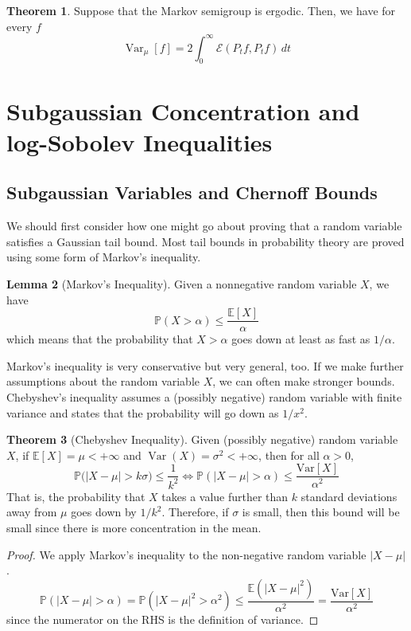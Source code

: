\documentclass{article}
\DeclareMathOperator{\Var}{Var}
\theoremstyle{definition}
\newtheorem{theorem}{Theorem}[section]
\newtheorem{lemma}[theorem]{Lemma}
\theoremstyle{remark}
\theoremstyle{definition}
\begin{document}
  \begin{theorem}
  Suppose that the Markov semigroup is ergodic. Then, we have for every $f$ 
  \[\Var_\mu [f] = 2 \int_0^\infty \mathcal{E}(P_t f, P_t f) \, dt\]
  \end{theorem}

\section{Subgaussian Concentration and log-Sobolev Inequalities}

  \subsection{Subgaussian Variables and Chernoff Bounds}

  We should first consider how one might go about proving that a random variable satisfies a Gaussian tail bound. Most tail bounds in probability theory are proved using some form of Markov's inequality. 
  \begin{lemma}[Markov's Inequality]
  Given a nonnegative random variable $X$, we have 
  \[\mathbb{P}(X > \alpha) \leq \frac{\mathbb{E}[X]}{\alpha}\]
  which means that the probability that $X > \alpha$ goes down at least as fast as $1/\alpha$. 
  \end{lemma}

  Markov's inequality is very conservative but very general, too. If we make further assumptions about the random variable $X$, we can often make stronger bounds. Chebyshev's inequality assumes a (possibly negative) random variable with finite variance and states that the probability will go down as $1/x^2$. 

  \begin{theorem}[Chebyshev Inequality]
  Given (possibly negative) random variable $X$, if $\mathbb{E}[X] = \mu < +\infty$ and $\Var(X) = \sigma^2 < +\infty$, then for all $\alpha > 0$, 
  \[\mathbb{P} \big( |X - \mu| > k \sigma \big) \leq \frac{1}{k^2} \iff \mathbb{P}(|X - \mu| > \alpha) \leq \frac{\mathrm{Var}[X]}{\alpha^2}\]
  That is, the probability that $X$ takes a value further than $k$ standard deviations away from $\mu$ goes down by $1/k^2$. Therefore, if $\sigma$ is small, then this bound will be small since there is more concentration in the mean. 
  \end{theorem}
  \begin{proof}
  We apply Markov's inequality to the non-negative random variable $|X - \mu|$. 
  \[\mathbb{P}(|X - \mu| > \alpha) = \mathbb{P}(|X - \mu|^2 > \alpha^2) \leq \frac{\mathbb{E}(|X - \mu|^2)}{\alpha^2} = \frac{\mathrm{Var}[X]}{\alpha^2}\]
  since the numerator on the RHS is the definition of variance. 
  \end{proof}
\end{document}
